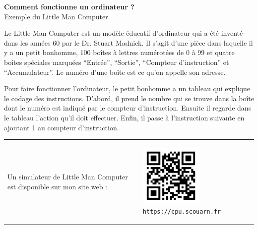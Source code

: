 \documentclass[12pt]{article}
\begin{document}
\sffamily

\begin{center}
    \LARGE\textbf{Comment fonctionne un ordinateur ?} \\
    \large Exemple du Little Man Computer. \\
\end{center}

\normalsize
Le Little Man Computer est un modèle éducatif d'ordinateur qui a été inventé dans les années 60 par le Dr. Stuart Madnick.
Il s'agit d'une pièce dans laquelle il y a un petit bonhomme, 100 boîtes à lettres
numérotées de 0 à 99 et quatre boîtes spéciales marquées \enquote{Entrée}, \enquote{Sortie}, \enquote{Compteur d'instruction} et \enquote{Accumulateur}.
Le numéro d'une boîte est ce qu'on appelle son adresse.
\par
Pour faire fonctionner l'ordinateur, le petit bonhomme a un tableau qui explique le codage des instructions.
D'abord, il prend le nombre qui se trouve dans la boîte dont le numéro est indiqué par le compteur d'instruction.
Ensuite il regarde dans le tableau l'action qu'il doit effectuer.
Enfin, il passe à l'instruction suivante en ajoutant 1 au compteur d'instruction.

\begin{center}
\begin{tabular}{m{7cm} m{5cm}}
    Un simulateur de Little Man Computer est disponible sur mon site web :
& 
    \begin{center}
    \includegraphics[width=3.0cm]{figures/qrcode.png}
    \texttt{https://cpu.scouarn.fr}
    \end{center}
\end{tabular}
\end{center}
\end{document}
